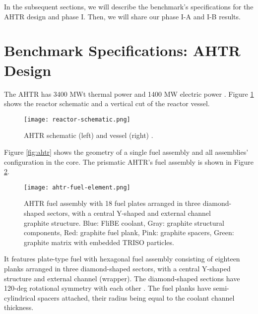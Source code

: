 In the subsequent sections, we will describe the benchmark's specifications for 
the \gls{AHTR} design and phase I. Then, we will share our phase I-A and I-B 
results. 

\section{Benchmark Specifications: AHTR Design}
The \gls{AHTR} has 3400 MWt thermal power and 1400 MW electric power 
\cite{varma_ahtr_2012}. 
Figure \ref{fig:reactor-schematic} shows the reactor schematic and a vertical 
cut of the reactor vessel. 
\begin{figure}[]
    \centering
    \texttt{[image: reactor-schematic.png]} 
    \caption{\acrlong{AHTR} schematic (left) and vessel (right) 
    \cite{noauthor_fluoride_nodate}.}
    \label{fig:reactor-schematic}
\end{figure}
Figure \ref{fig:ahtr} shows the geometry of a single fuel assembly and all 
assemblies' configuration in the core.
The prismatic \gls{AHTR}'s fuel assembly is shown in Figure 
\ref{fig:ahtr-fuel-assembly}.  
\begin{figure}[]
    \centering
    \texttt{[image: ahtr-fuel-element.png]} 
    \caption{\acrlong{AHTR} fuel assembly with 18 fuel plates arranged in 
    three diamond-shaped sectors, with a central Y-shaped and external channel 
    graphite structure. Blue: FliBE coolant, Gray: graphite structural components, 
    Red: graphite fuel plank, Pink: graphite spacers, Green: graphite matrix 
    with embedded TRISO particles.}
    \label{fig:ahtr-fuel-assembly}
\end{figure}
It features plate-type fuel with hexagonal fuel assembly consisting of eighteen 
planks arranged in three diamond-shaped sectors, with a central Y-shaped 
structure and external channel (wrapper).
The diamond-shaped sections have 120-deg rotational symmetry with each other 
\cite{varma_ahtr_2012,ramey_monte_2018,noauthor_fluoride_nodate}. 
The fuel planks have semi-cylindrical spacers attached, their radius being 
equal to the coolant channel thickness. 

